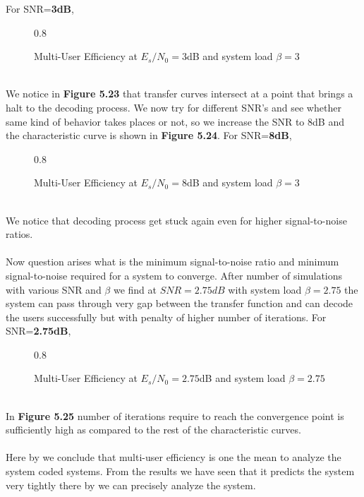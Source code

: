 For SNR=\textbf{3dB},
\begin{figure*}[htb]
\centerline{  {0.8}}
\caption{Multi-User Efficiency at $E_s/N_0=3$dB and system load $\beta=3$}
\end{figure*}\\
We notice in \textbf{Figure 5.23} that transfer curves intersect at a point that brings a halt to the decoding process. We now try for different SNR's and see whether same kind of behavior takes places or not, so we increase the SNR to 8dB and the characteristic curve is shown in \textbf{Figure 5.24}.
\newpage
For SNR=\textbf{8dB},
\begin{figure*}[htb]
\centerline{  {0.8}}
\caption{Multi-User Efficiency at $E_s/N_0=8$dB and system load $\beta=3$}
\end{figure*}\\
We notice that decoding process get stuck again even for higher signal-to-noise ratios. \\ \\
Now question arises what is the minimum signal-to-noise ratio and minimum signal-to-noise required for a system to converge. After number of simulations with various SNR and $\beta$ we find at $SNR=2.75dB$ with system load $\beta=2.75$ the system can pass through very gap between the transfer function and can decode the users successfully but with penalty of higher number of iterations.
For SNR=\textbf{2.75dB},
\begin{figure*}[htb]
\centerline{  {0.8}}
\caption{Multi-User Efficiency at $E_s/N_0=2.75$dB and system load $\beta=2.75$}
\end{figure*}\\
In \textbf{Figure 5.25} number of iterations require to reach the convergence point is sufficiently high as compared to the rest of the characteristic curves. \\ \\
Here by we conclude that multi-user efficiency is one the mean to analyze the system coded systems. From the results we have seen that it predicts the system very tightly there by we can precisely analyze the system.
\newpage
